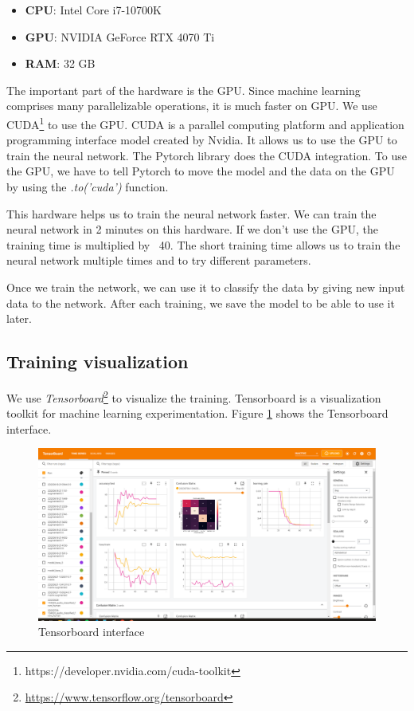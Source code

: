 \begin{itemize}
    \item \textbf{CPU}: Intel Core i7-10700K
    \item \textbf{GPU}: NVIDIA GeForce RTX 4070 Ti
    \item \textbf{RAM}: 32 GB
\end{itemize}

The important part of the hardware is the GPU. Since machine learning comprises many parallelizable operations, it is much faster on GPU. We use CUDA\footnote{https://developer.nvidia.com/cuda-toolkit} to use the GPU. CUDA is a parallel computing platform and application programming interface model created by Nvidia. It allows us to use the GPU to train the neural network. The Pytorch library does the CUDA integration. To use the GPU, we have to tell Pytorch to move the model and the data on the GPU by using the \textit{.to('cuda')} function.

This hardware helps us to train the neural network faster. We can train the neural network in 2 minutes on this hardware. If we don't use the GPU, the training time is multiplied by ~40. The short training time allows us to train the neural network multiple times and to try different parameters.

Once we train the network, we can use it to classify the data by giving new input data to the network. After each training, we save the model to be able to use it later.

\subsection{Training visualization}

We use \textit{Tensorboard}\footnote{\url{https://www.tensorflow.org/tensorboard}} to visualize the training. Tensorboard is a visualization toolkit for machine learning experimentation. Figure \ref{fig:tensorboard} shows the Tensorboard interface.

\begin{figure}[H]
    \centering
    \includegraphics[width=.8\textwidth]{images/tensorboard.png}
    \caption{Tensorboard interface}
    \label{fig:tensorboard}
\end{figure}

